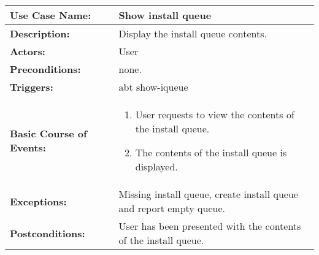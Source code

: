 
\begin{tabularx}{\linewidth}{|l|X|}
\hline
\textbf{Use Case Name:} & \textbf{Show install queue} \\
\hline
\textbf{Description:} & Display the install queue contents. \\
\hline
\textbf{Actors:} & User \\
\hline
\textbf{Preconditions:} & none. \\
\hline
\textbf{Triggers:} & abt show-iqueue \\
\hline
\textbf{Basic Course of Events:} & 
\begin{minipage}{\linewidth} 
  \vspace{0.05em}
  \begin{enumerate}
    \item User requests to view the contents of the install queue.
    \item The contents of the install queue is displayed.
  \end{enumerate}
  \vspace{0.05em}
\end{minipage}
\\
\hline 
\textbf{Exceptions:} & Missing install queue, create install queue and report empty queue. \\
\hline 
\textbf{Postconditions:} &
User has been presented with the contents of the install queue. \\
\hline
\end{tabularx}


